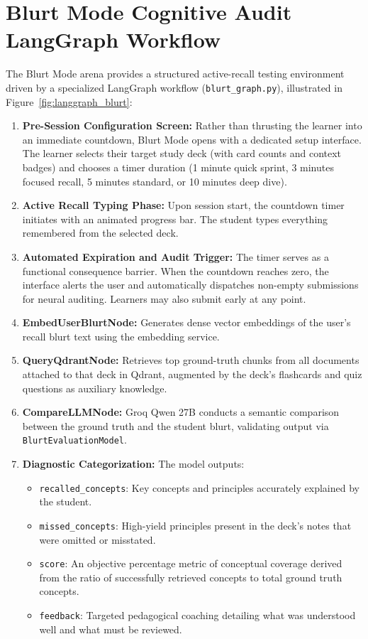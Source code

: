 \documentclass[12pt,a4paper,oneside]{report}
\begin{document}
\section{Blurt Mode Cognitive Audit LangGraph Workflow}
The Blurt Mode arena provides a structured active-recall testing environment driven by a specialized LangGraph workflow (\texttt{blurt\_graph.py}), illustrated in Figure~\ref{fig:langgraph_blurt}:
\begin{enumerate}
    \item \textbf{Pre-Session Configuration Screen:} Rather than thrusting the learner into an immediate countdown, Blurt Mode opens with a dedicated setup interface. The learner selects their target study deck (with card counts and context badges) and chooses a timer duration (1 minute quick sprint, 3 minutes focused recall, 5 minutes standard, or 10 minutes deep dive).
    \item \textbf{Active Recall Typing Phase:} Upon session start, the countdown timer initiates with an animated progress bar. The student types everything remembered from the selected deck.
    \item \textbf{Automated Expiration and Audit Trigger:} The timer serves as a functional consequence barrier. When the countdown reaches zero, the interface alerts the user and automatically dispatches non-empty submissions for neural auditing. Learners may also submit early at any point.
    \item \textbf{EmbedUserBlurtNode:} Generates dense vector embeddings of the user's recall blurt text using the embedding service.
    \item \textbf{QueryQdrantNode:} Retrieves top ground-truth chunks from all documents attached to that deck in Qdrant, augmented by the deck's flashcards and quiz questions as auxiliary knowledge.
    \item \textbf{CompareLLMNode:} Groq Qwen 27B conducts a semantic comparison between the ground truth and the student blurt, validating output via \texttt{BlurtEvaluationModel}.
    \item \textbf{Diagnostic Categorization:} The model outputs:
    \begin{itemize}
        \item \texttt{recalled\_concepts}: Key concepts and principles accurately explained by the student.
        \item \texttt{missed\_concepts}: High-yield principles present in the deck's notes that were omitted or misstated.
        \item \texttt{score}: An objective percentage metric of conceptual coverage derived from the ratio of successfully retrieved concepts to total ground truth concepts.
        \item \texttt{feedback}: Targeted pedagogical coaching detailing what was understood well and what must be reviewed.
    \end{itemize}
\end{enumerate}
\end{document}
